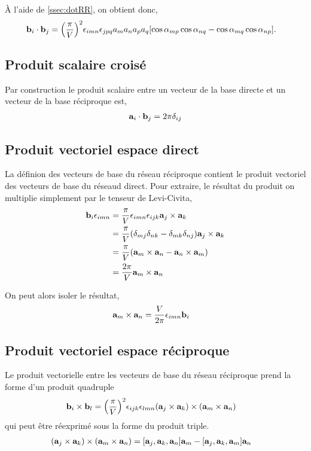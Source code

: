 \documentclass[11pt]{article}
\begin{document}
À l'aide de \ref{ssec:dotRR}, on obtient donc,
\begin{align*}
	\vb{b}_i \cdot \vb{b}_j 
	&= \pqty{\frac{\pi}{V}}^2 \epsilon_{imn} \epsilon_{jpq} a_m a_n a_p a_q \bqty{\cos\alpha_{mp}\cos\alpha_{nq} - \cos\alpha_{mq}\cos\alpha_{np}}.
\end{align*}

\subsection{Produit scalaire croisé}
Par construction le produit scalaire entre un vecteur de la base directe et un vecteur de la base réciproque est,
\begin{align*}
	\vb{a}_i \cdot \vb{b}_j = 2\pi \delta_{ij}
\end{align*}

\subsection{Produit vectoriel espace direct}
La définion des vecteurs de base du réseau réciproque contient le produit vectoriel des vecteurs de base du réseaud direct. Pour extraire, le résultat du produit on multiplie simplement par le tenseur de Levi-Civita,
\begin{align*}
	\vb{b}_i\epsilon_{imn} &= \frac{\pi}{V}\epsilon_{imn} \epsilon_{ijk} \vb{a}_j \times \vb{a}_k \\
	&= \frac{\pi}{V}\pqty{\delta_{mj}\delta_{nk} - \delta_{mk}\delta_{nj}} \vb{a}_j \times \vb{a}_k \\
	&= \frac{\pi}{V}\pqty{\vb{a}_m \times \vb{a}_n - \vb{a}_n \times \vb{a}_m} \\
	&= \frac{2\pi}{V}\vb{a}_m \times \vb{a}_n
\end{align*}

On peut alors isoler le résultat,
\begin{align*}
	\vb{a}_m \times \vb{a}_n &=\frac{V}{2\pi} \epsilon_{imn} \vb{b}_i
\end{align*}


\subsection{Produit vectoriel espace réciproque}
Le produit vectorielle entre les vecteurs de base du réseau réciproque prend la forme d'un produit quadruple
\begin{align*}
	\vb{b}_i \times \vb{b}_l &= \pqty{\frac{\pi}{V}}^2 \epsilon_{ijk} \epsilon_{lmn} \pqty{\vb{a}_j \times \vb{a}_k} \times \pqty{\vb{a}_m \times \vb{a}_n}
\end{align*} qui peut être réexprimé sous la forme du produit triple.
\begin{align*}
	\pqty{\vb{a}_j \times \vb{a}_k} \times \pqty{\vb{a}_m \times \vb{a}_n} &= 
	\bqty{\vb{a}_j,\vb{a}_k,\vb{a}_n} \vb{a}_m - \bqty{\vb{a}_j,\vb{a}_k,\vb{a}_m} \vb{a}_n
\end{align*}
\end{document}
